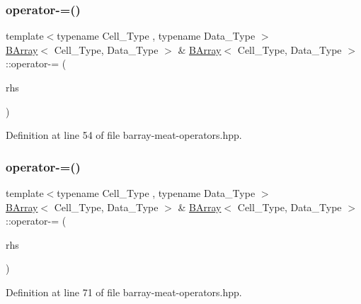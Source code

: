 \subsubsection{\texorpdfstring{operator-\/=()}{operator-=()}\hspace{0.1cm}{\footnotesize\ttfamily [2/3]}}
{\footnotesize\ttfamily template$<$typename Cell\+\_\+\+Type , typename Data\+\_\+\+Type $>$ \\
\hyperlink{class_b_array}{B\+Array}$<$ Cell\+\_\+\+Type, Data\+\_\+\+Type $>$ \& \hyperlink{class_b_array}{B\+Array}$<$ Cell\+\_\+\+Type, Data\+\_\+\+Type $>$\+::operator-\/= (\begin{DoxyParamCaption}\item[{const \hyperlink{class_b_array}{B\+Array}$<$ Cell\+\_\+\+Type, Data\+\_\+\+Type $>$ \&}]{rhs }\end{DoxyParamCaption})\hspace{0.3cm}{\ttfamily [inline]}}



Definition at line 54 of file barray-\/meat-\/operators.\+hpp.

\mbox{\label{class_b_array_ae43e3345fccd4d1ef05fb4d063f07b7b}} 
\subsubsection{\texorpdfstring{operator-\/=()}{operator-=()}\hspace{0.1cm}{\footnotesize\ttfamily [3/3]}}
{\footnotesize\ttfamily template$<$typename Cell\+\_\+\+Type , typename Data\+\_\+\+Type $>$ \\
\hyperlink{class_b_array}{B\+Array}$<$ Cell\+\_\+\+Type, Data\+\_\+\+Type $>$ \& \hyperlink{class_b_array}{B\+Array}$<$ Cell\+\_\+\+Type, Data\+\_\+\+Type $>$\+::operator-\/= (\begin{DoxyParamCaption}\item[{const Cell\+\_\+\+Type \&}]{rhs }\end{DoxyParamCaption})\hspace{0.3cm}{\ttfamily [inline]}}



Definition at line 71 of file barray-\/meat-\/operators.\+hpp.

\mbox{\label{class_b_array_a39dab15e2d3c22ac7bb80aba51faf743}} 
